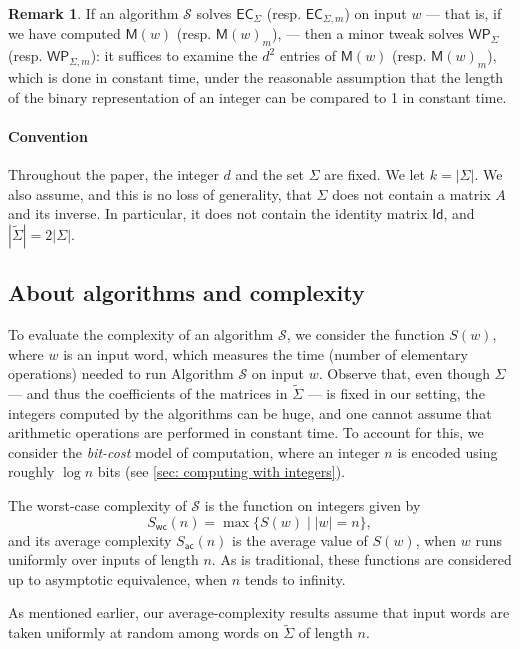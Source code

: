 \documentclass{article}
\def\alph{\tilde{\Sigma}}
\def\Id{\textsf{Id}}
\def\calS{\mathcal{S}}
\def\EC{\textsf{EC}}
\def\WP{\textsf{WP}}
\def\mat{\textsf{M}}
\theoremstyle{plain}
\theoremstyle{definition}
\newtheorem{remark}[theorem]{Remark}
\begin{document}
\begin{remark}\label{rk: from EC to WP}
    If an algorithm $\calS$ solves $\EC_\Sigma$ (resp. $\EC_{\Sigma,m}$) on input $w$ --- that is, if we have computed $\mat(w)$ (resp. $\mat(w)_m$), --- then a minor tweak solves $\WP_\Sigma$ (resp. $\WP_{\Sigma,m}$): it suffices to examine the $d^2$ entries of $\mat(w)$ (resp. $\mat(w)_m$), which is done in constant time, under the reasonable assumption that the length of the binary representation of an integer can be compared to 1 in constant time.
\end{remark}

\paragraph{Convention}
%
Throughout the paper, the integer $d$ and the set $\Sigma$ are fixed. We let $k = |\Sigma|$. We also assume, and this is no loss of generality, that $\Sigma$ does not contain a matrix $A$ and its inverse. In particular, it does not contain the identity matrix $\Id$, and $|\alph| = 2|\Sigma|$.


\subsection{About algorithms and complexity}

To evaluate the complexity of an algorithm $\calS$, we consider the function $S(w)$, where $w$ is an input word, which measures the time (number of elementary operations) needed to run Algorithm $\calS$ on input $w$. Observe that, even though $\Sigma$ --- and thus the coefficients of the matrices in $\alph$ --- is fixed in our setting, the integers computed by the algorithms can be huge, and one cannot assume that arithmetic operations are performed in constant time. To account for this, we consider the \emph{bit-cost} model of computation, where an integer $n$ is encoded using roughly $\log n$ bits (see \cref{sec: computing with integers}).

The worst-case complexity of $\calS$ is the function on integers given by
%
$$S_{\textsf{wc}}(n) = \max\{S(w) \mid |w| = n\},$$
%
and its average complexity $S_{\textsf{ac}}(n)$ is the average value of $S(w)$, when $w$ runs uniformly over inputs of length $n$. As is traditional, these functions are considered up to asymptotic equivalence, when $n$ tends to infinity.

As mentioned earlier, our average-complexity results assume that input words are taken uniformly at random among words on $\alph$ of length $n$.
\end{document}
